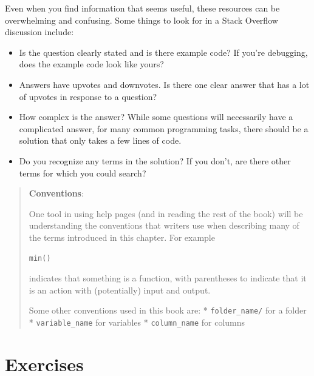 \documentclass[]{Nemilov}
\providecommand{\tightlist}{%
  \setlength{\itemsep}{0pt}\setlength{\parskip}{0pt}}
\begin{document}
Even when you find information that seems useful,
these resources can be overwhelming and confusing.
Some things to look for in a Stack Overflow discussion include:

\begin{itemize}
\tightlist
\item
  Is the question clearly stated and is there example code? If you're
  debugging, does the example code look like yours?
\item
  Answers have upvotes and downvotes. Is there one clear answer that has a lot
  of upvotes in response to a question?
\item
  How complex is the answer? While some questions will necessarily have a
  complicated answer, for many common programming tasks, there should be a
  solution that only takes a few lines of code.
\item
  Do you recognize any terms in the solution? If you don't, are there other
  terms for which you could search?
\end{itemize}

\begin{quote}
\textbf{Conventions}:

One tool in using help pages (and in reading the rest of the book) will
be understanding the conventions that writers use when describing
many of the terms introduced in this chapter. For example

\begin{verbatim}
min()
\end{verbatim}

indicates that something is a function, with parentheses to indicate
that it is an action with (potentially) input and output.

Some other conventions used in this book are:
* \texttt{folder\_name/} for a folder
* \texttt{variable\_name} for variables
* \texttt{column\_name} for columns
\end{quote}

\hypertarget{exercises}{%
\section{Exercises}\label{exercises}}
\end{document}
